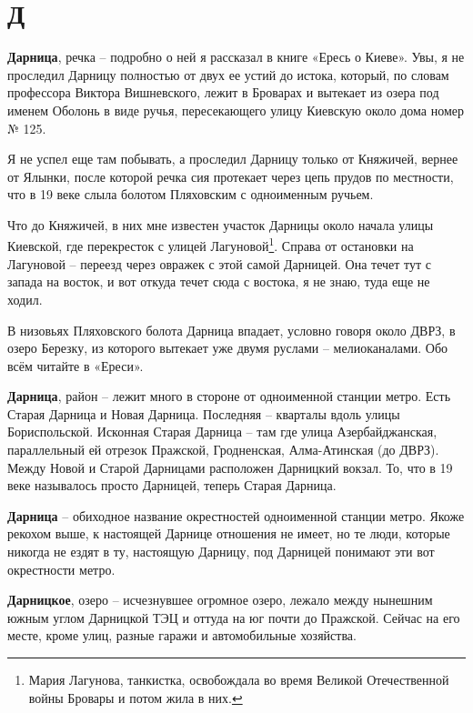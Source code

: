 \chapter*{Д}

\textbf{Дарница}, речка – подробно о ней я рассказал в книге «Ересь о Киеве». Увы, я не проследил Дарницу полностью от двух ее устий до истока, который, по словам профессора Виктора Вишневского, лежит в Броварах и вытекает из озера под именем Оболонь в виде ручья, пересекающего улицу Киевскую около дома номер № 125.

Я не успел еще там побывать, а проследил Дарницу только от Княжичей, вернее от Ялынки, после которой речка сия протекает через цепь прудов по местности, что в 19 веке слыла болотом Пляховским с одноименным ручьем.

Что до Княжичей, в них мне известен участок Дарницы около начала улицы Киевской, где перекресток с улицей Лагуновой\footnote{Мария Лагунова, танкистка, освобождала во время Великой Отечественной войны Бровары и потом жила в них.}. Справа от остановки на Лагуновой – переезд через овражек с этой самой Дарницей. Она течет тут с запада на восток, и вот откуда течет сюда с востока, я не знаю, туда еще не ходил.

В низовьях Пляховского болота Дарница впадает, условно говоря около ДВРЗ, в озеро Березку, из которого вытекает уже двумя руслами – мелиоканалами. Обо всём читайте в «Ереси».\\

\medskip

\textbf{Дарница}, район – лежит много в стороне от одноименной станции метро. Есть Старая Дарница и Новая Дарница. Последняя – кварталы вдоль улицы Бориспольской. Исконная Старая Дарница – там где улица Азербайджанская, параллельный ей отрезок Пражской, Гродненская, Алма-Атинская (до ДВРЗ). Между Новой и Старой Дарницами расположен Дарницкий вокзал. То, что в 19 веке называлось просто Дарницей, теперь Старая Дарница.\\

\medskip

\textbf{Дарница} – обиходное название окрестностей одноименной станции метро. Якоже рекохом выше, к настоящей Дарнице отношения не имеет, но те люди, которые никогда не ездят в ту, настоящую Дарницу, под Дарницей понимают эти вот окрестности метро.\\

\medskip

\textbf{Дарницкое}, озеро – исчезнувшее огромное озеро, лежало между нынешним южным углом Дарницкой ТЭЦ и оттуда на юг почти до Пражской. Сейчас на его месте, кроме улиц, разные гаражи и автомобильные хозяйства.

